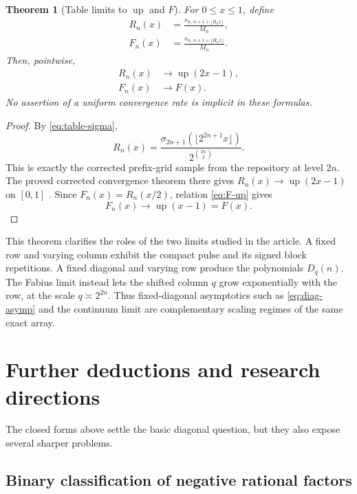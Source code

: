 \documentclass[11pt]{article}
\newtheorem{theorem}{Theorem}[section]
\theoremstyle{definition}
\theoremstyle{remark}
\newcommand{\Diag}{D}
\newcommand{\Up}{\operatorname{up}}
\begin{document}
\begin{theorem}[Table limits to \(\Up\) and \(F\)]
\label{thm:table-fabius-limit}
For \(0\leq x\leq1\), define
\begin{align}
 R_n(x)&=\frac{s_{n,\,n+1+\lfloor B_nx\rfloor}}{M_n},      \label{eq:Rn}\\
 F_n(x)&=\frac{s_{n,\,n+1+\lfloor H_nx\rfloor}}{M_n}.      \label{eq:Fn}
\end{align}
Then, pointwise,
\begin{align}
 R_n(x)&\longrightarrow \Up(2x-1),                        \label{eq:Rn-limit}\\
 F_n(x)&\longrightarrow F(x).                             \label{eq:Fn-limit}
\end{align}
No assertion of a uniform convergence rate is implicit in these formulas.
\end{theorem}

\begin{proof}
By \cref{eq:table-sigma},
\[
 R_n(x)=
 \frac{\sigma_{2n+1}(\lfloor2^{2n+1}x\rfloor)}
      {2^{\binom{2n}{2}}}.
\]
This is exactly the corrected prefix-grid sample from the repository at
level \(2n\).  The proved corrected convergence theorem there gives
\(R_n(x)\to\Up(2x-1)\) on \([0,1]\) \cite{ProveIt}.  Since
\(F_n(x)=R_n(x/2)\), relation \cref{eq:F-up} gives
\[
 F_n(x)\longrightarrow \Up(x-1)=F(x).
\]
\end{proof}

This theorem clarifies the roles of the two limits studied in the article.
A fixed row and varying column exhibit the compact pulse and its signed
block repetitions.  A fixed diagonal and varying row produce the
polynomials \(\Diag_q(n)\).  The Fabius limit instead lets the shifted
column \(q\) grow exponentially with the row, at the scale
\(q\asymp2^{2n}\).  Thus fixed-diagonal asymptotics such as
\cref{eq:diag-asymp} and the continuum limit are complementary scaling
regimes of the same exact array.

\section{Further deductions and research directions}
\label{sec:future}

The closed forms above settle the basic diagonal question, but they also
expose several sharper problems.

\subsection{Binary classification of negative rational factors}
\end{document}
